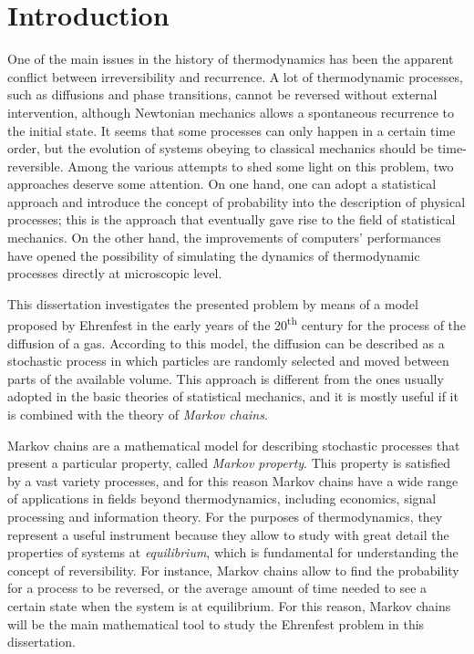 \chapter{Introduction}
One of the main issues in the history of thermodynamics has been the apparent conflict between irreversibility and recurrence. A lot of thermodynamic processes, such as diffusions and phase transitions, cannot be reversed without external intervention, although Newtonian mechanics allows a spontaneous recurrence to the initial state. It seems that some processes can only happen in a certain time order, but the evolution of systems obeying to classical mechanics should be time-reversible. Among the various attempts to shed some light on this problem, two approaches deserve some attention. On one hand, one can adopt a statistical approach and introduce the concept of probability into the description of physical processes; this is the approach that eventually gave rise to the field of statistical mechanics. On the other hand, the improvements of computers' performances have opened the possibility of simulating the dynamics of thermodynamic processes directly at microscopic level.

This dissertation investigates the presented problem by means of a model proposed by Ehrenfest in the early years of the 20\textsuperscript{th} century for the process of the diffusion of a gas. According to this model, the diffusion can be described as a stochastic process in which particles are randomly selected and moved between parts of the available volume. This approach is different from the ones usually adopted in the basic theories of statistical mechanics, and it is mostly useful if it is combined with the theory of \emph{Markov chains}.

Markov chains are a mathematical model for describing stochastic processes that present a particular property, called \emph{Markov property}. This property is satisfied by a vast variety processes, and for this reason Markov chains have a wide range of applications in fields beyond thermodynamics, including economics, signal processing and information theory. For the purposes of thermodynamics, they represent a useful instrument because they allow to study with great detail the properties of systems at \emph{equilibrium}, which is fundamental for understanding the concept of reversibility. For instance, Markov chains allow to find the probability for a process to be reversed, or the average amount of time needed to see a certain state when the system is at equilibrium. For this reason, Markov chains will be the main mathematical tool to study the Ehrenfest problem in this dissertation.


